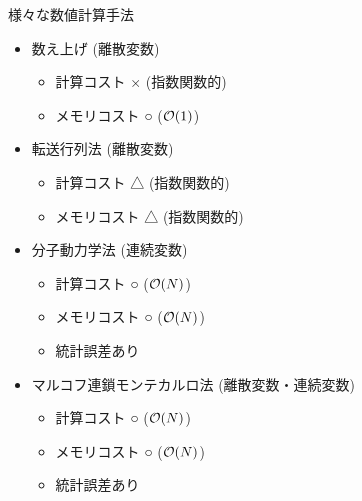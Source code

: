 
\begin{frame}[t,fragile]{様々な数値計算手法}
  \begin{itemize}
  \item 数え上げ (離散変数)
    \begin{itemize}
      \item 計算コスト × (指数関数的)
      \item メモリコスト ○ (${\cal O}(1)$)
    \end{itemize}
  \item 転送行列法 (離散変数)
    \begin{itemize}
      \item 計算コスト △ (指数関数的)
      \item メモリコスト △ (指数関数的)
    \end{itemize}
  \item 分子動力学法 (連続変数)
    \begin{itemize}
      \item 計算コスト ○ (${\cal O}(N)$)
      \item メモリコスト ○ (${\cal O}(N)$)
      \item 統計誤差あり
    \end{itemize}
  \item マルコフ連鎖モンテカルロ法 (離散変数・連続変数)
    \begin{itemize}
      \item 計算コスト ○ (${\cal O}(N)$)
      \item メモリコスト ○ (${\cal O}(N)$)
      \item 統計誤差あり
    \end{itemize}
  \end{itemize}
\end{frame}
